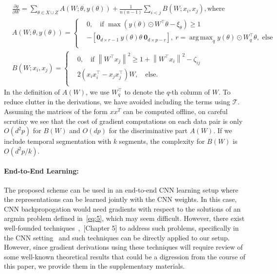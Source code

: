 \documentclass[runningheads]{llncs}
\newcommand{\enorm}[1]{\left\|{#1}\right\|}
\newcommand{\bigoh}{O}
\DeclareMathOperator*{\argmax}{arg\,max}
\begin{document}
\begin{align}
&\frac{\partial{g}}{\partial W} = \sum_{\theta \in X\cup Z} A(W; \theta,y(\theta)) + \frac{1}{n(n-1)}\sum_{i<j}B(W;x_i,x_j), \text{where }\\
&A(W; \theta, y(\theta)) = \left\{ 
\begin{array}{ll} 
&0, \quad \text{if } \max(y(\theta)\odot W^\top\theta-\xi_{\theta}) \geq 1\\
&-\left[\mathbf{0}_{d\times r\!-\!1}\ y(\theta)\theta\  \mathbf{0}_{d\times p-r}\right],\ r=\argmax_q y(\theta)\!\odot\!W^\top_q\theta, \text{ else}\\
\end{array}
\right.\\
&B(W; x_i, x_j) = \left\{ 
\begin{array}{ll} 
&0, \quad \text{if } \enorm{W^\top x_j}^2 \geq 1+\enorm{W^\top x_i}^2 -\zeta_{ij} \\
&2(x_ix_i^\top -x_jx_j^\top)W,\quad \text{else.}\\
\end{array}
\right.
\end{align}
In the definition of $A(W)$, we use $W^\top_q$ to denote the $q$-th column of $W$. To reduce clutter in the derivations, we have avoided including the terms using $\mathcal{T}$. Assuming the matrices of the form $xx^T$ can be computed offline, on careful scrutiny we see that the cost of gradient computations on each data pair is only $\bigoh(d^2p)$ for $B(W)$ and $\bigoh(dp)$ for the discriminative part $A(W)$. If we include temporal segmentation with $k$ segments, the complexity for $B(W)$ is $\bigoh(d^2p/k)$.

\noindent\paragraph*{\textbf{End-to-End Learning:}} The proposed scheme can be used in an end-to-end CNN learning setup where the representations can be learned jointly with the CNN weights. In this case, CNN backpropogation would need gradients with respect to the solutions of an argmin problem defined in~\eqref{eq:5}, which may seem difficult. However, there exist well-founded techniques~\cite{chiang1984fundamental},~\cite{faugeras1993three}[Chapter 5] to address such problems, specifically in the CNN setting~\cite{gould2016differentiating} and such techniques can be directly applied to our setup. However, since gradient derivations using these techniques will require review of some well-known theoretical results that could be a digression from the course of this paper, we provide them in the supplementary materials. 
\end{document}
